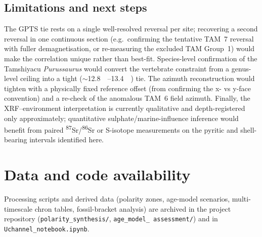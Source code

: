 \documentclass[11pt]{article}
\begin{document}
\subsection{Limitations and next steps}
The GPTS tie rests on a single well-resolved reversal per site; recovering a
second reversal in one continuous section (e.g.\ confirming the tentative TAM~7
reversal with fuller demagnetisation, or re-measuring the excluded TAM Group~1)
would make the correlation unique rather than best-fit. Species-level
confirmation of the Tamshiyacu \textit{Purussaurus} would convert the vertebrate
constraint from a genus-level ceiling into a tight
($\sim$\SIrange{12.8}{13.4}{\mega\annum}) tie. The azimuth reconstruction would
tighten with a physically fixed reference offset (from confirming the x- vs
y-face convention) and a re-check of the anomalous TAM~6 field azimuth.
Finally, the XRF--environment interpretation is currently qualitative and
depth-registered only approximately; quantitative sulphate/marine-influence
inference would benefit from paired \textsuperscript{87}Sr/\textsuperscript{86}Sr
or S-isotope measurements on the pyritic and shell-bearing intervals identified
here.

\section{Data and code availability}
Processing scripts and derived data (polarity zones, age-model scenarios,
multi-timescale chron tables, fossil-bracket analysis) are archived in the
project repository (\texttt{polarity\_synthesis/}, \texttt{age\_model\_
assessment/}) and in \texttt{Uchannel\_notebook.ipynb}.
\end{document}
